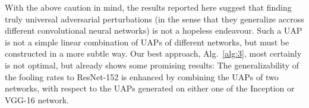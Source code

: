 \documentclass[runningheads]{llncs}
\begin{document}
With the above caution in mind, the results reported here suggest that finding truly universal adversarial perturbations (in the sense that they generalize accross different convolutional neural networks) is not a hopeless endeavour. Such a UAP is not a simple linear combination of UAPs of different networks, but must be constructed in a more subtle way. Our best approach, Alg.~\ref{alg:3}, most certainly is not optimal, but already shows some promising results: The generalizability of the fooling rates to ResNet-152 is enhanced by combining the UAPs of two networks, with respect to the UAPs generated on either one of the Inception or VGG-16 network.



\end{document}
